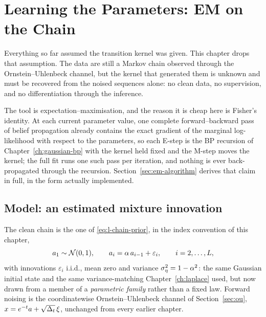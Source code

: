 \chapter{Learning the Parameters: EM on the Chain}\label{ch:em-method}

Everything so far assumed the transition kernel was given. This chapter drops
that assumption. The data are still a Markov chain observed through the
Ornstein--Uhlenbeck channel, but the kernel that generated them is unknown and
must be recovered from the noised sequences alone: no clean data, no
supervision, and no differentiation through the inference.

The tool is expectation--maximisation, and the reason it is cheap here is
Fisher's identity. At each current parameter value, one complete
forward--backward pass of belief propagation already contains the exact
gradient of the marginal log-likelihood with respect to the parameters, so
each E-step is the BP recursion of Chapter~\ref{ch:gaussian-bp} with the
kernel held fixed and the M-step moves the kernel; the full fit runs one such
pass per iteration, and nothing is ever back-propagated through the recursion.
Section~\ref{sec:em-algorithm} derives that claim in full, in the form
actually implemented.

\section{Model: an estimated mixture innovation}\label{sec:em-model}

The clean chain is the one of \eqref{eq:l-chain-prior}, in the index
convention of this chapter,
\begin{equation}
  a_1 \sim \mathcal{N}(0,1), \qquad a_i = \alpha\, a_{i-1} + \varepsilon_i,
  \qquad i = 2,\dots,L,
  \label{eq:em-chain}
\end{equation}
with innovations $\varepsilon_i$ i.i.d., mean zero and variance
$\sigma_\eta^2 = 1-\alpha^2$: the same Gaussian initial state and the same
variance-matching Chapter~\ref{ch:laplace} used, but now drawn from a member of
a \emph{parametric family} rather than a fixed law. Forward noising is the
coordinatewise Ornstein--Uhlenbeck channel of Section~\ref{sec:ou},
$x = e^{-t} a + \sqrt{\Delta_t}\,\xi$, unchanged from every earlier chapter.

